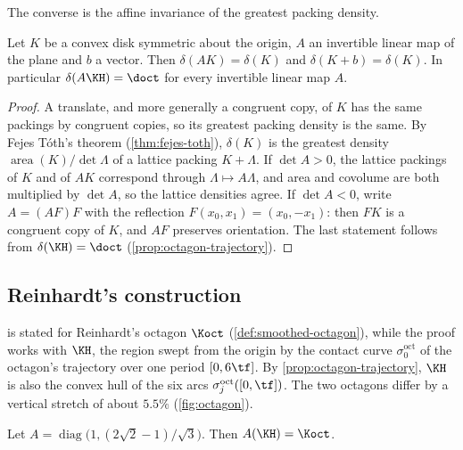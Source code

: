 The converse is the affine invariance of the greatest packing density.

\begin{proposition}\label{prop:converse}
Let $K$ be a convex disk symmetric about the origin, $A$ an invertible linear map of the plane and
$b$ a vector. Then $\delta(AK)=\delta(K)$ and $\delta(K+b)=\delta(K)$. In particular
$\delta(A\KH)=\doct$ for every invertible linear map $A$.
\end{proposition}

\begin{proof}
A translate, and more generally a congruent copy, of $K$ has the same packings by congruent copies,
so its greatest packing density is the same. By
Fejes T\'oth's theorem (\cref{thm:fejes-toth}), $\delta(K)$ is the greatest density
$\operatorname{area}(K)/\det\Lambda$ of a lattice packing $K+\Lambda$. If $\det A>0$, the
lattice packings of $K$ and of $AK$ correspond through $\Lambda\mapsto A\Lambda$, and area and
covolume are both multiplied by $\det A$, so the lattice densities agree. If $\det A<0$, write
$A=(AF)F$ with the reflection $F(x_0,x_1)=(x_0,-x_1)$: then $FK$ is a congruent copy of $K$, and
$AF$ preserves orientation. The last statement follows from $\delta(\KH)=\doct$
(\cref{prop:octagon-trajectory}).
\end{proof}

\subsection{Reinhardt's construction}\label{sec:equality-construction}

 is stated for Reinhardt's octagon $\Koct$ (\cref{def:smoothed-octagon}), while
the proof works with $\KH$, the region swept from the origin by the contact curve
$\sigma^{\mathrm{oct}}_0$ of the octagon's trajectory over one period $[0,6\tf]$. By
\cref{prop:octagon-trajectory}, $\KH$ is also the convex hull of the six arcs
$\sigma^{\mathrm{oct}}_j([0,\tf])$. The two octagons differ by a vertical stretch of about $5.5\%$
(\cref{fig:octagon}).

\begin{proposition}\label{prop:reinhardt-construction}
Let $A=\operatorname{diag}\bigl(1,(2\sqrt2-1)/\sqrt3\bigr)$. Then $A(\KH)=\Koct$.
\end{proposition}

